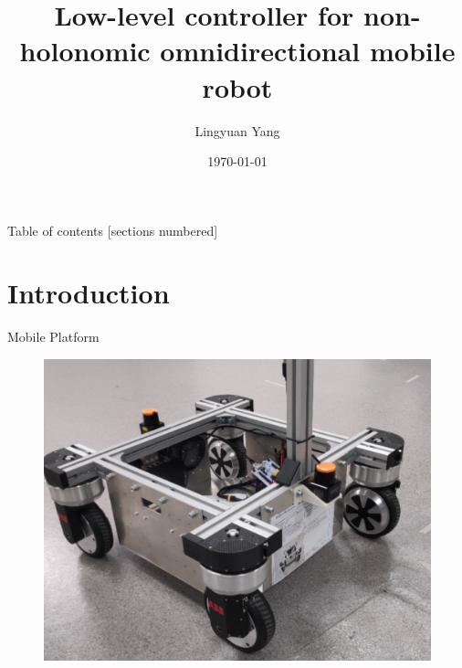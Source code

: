 \documentclass[10pt]{beamer}
\title{Low-level controller for non-holonomic omnidirectional mobile robot}
\date{\today}
\author{Lingyuan Yang}
\institute{Technische Universität Berlin\\ABB Corporate Research}
\begin{document}
\maketitle

\begin{frame}{Table of contents}
  [sections numbered]
  \tableofcontents[hideallsubsections]
\end{frame}

\section{Introduction}
\begin{frame}{Mobile Platform}
    \begin{figure}
        \centering
        \includegraphics[width=\textwidth]{Figure/mobilePlatform.jpg}
        \caption{}
        \label{fig:mobilePlatform}
    \end{figure}
\end{frame}
\end{document}
